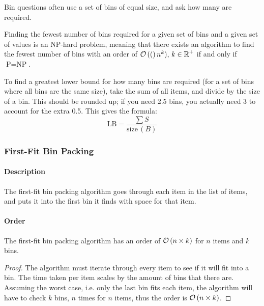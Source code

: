         Bin questions often use a set of bins of equal size, and ask how many are required.

        Finding the fewest number of bins required for a given set of bins and a given set of values is an NP-hard problem, meaning that there exists an algorithm to find the fewest number of bins with an order of $\mathcal{O}\left((\right)n^k),\,k\in\operatorname{\mathbb{R}}^+$ if and only if $\text{P}=\text{NP}$.

        To find a greatest lower bound for how many bins are required (for a set of bins where all bins are the same size), take the sum of all items, and divide by the size of a bin.
        This should be rounded up; if you need 2.5 bins, you actually need 3 to account for the extra 0.5.
        This gives the formula:
        \begin{equation}
            \text{LB}=\frac{\sum S}{\text{size}\,(B)}
        \end{equation}

        \subsubsection{First-Fit Bin Packing}
            \paragraph{Description}
                The first-fit bin packing algorithm goes through each item in the list of items, and puts it into the first bin it finds with space for that item.

            \paragraph{Order}
                \begin{theorem}
                    The first-fit bin packing algorithm has an order of $\mathcal{O}\left(n\times k\right)$ for $n$ items and $k$ bins.
                \end{theorem}
                \begin{proof}
                    The algorithm must iterate through every item to see if it will fit into a bin.
                    The time taken per item scales by the amount of bins that there are.
                    Assuming the worst case, i.e. only the last bin fits each item, the algorithm will have to check $k$ bins, $n$ times for $n$ items, thus the order is $\mathcal{O}\left(n\times k\right)$.
                \end{proof}

